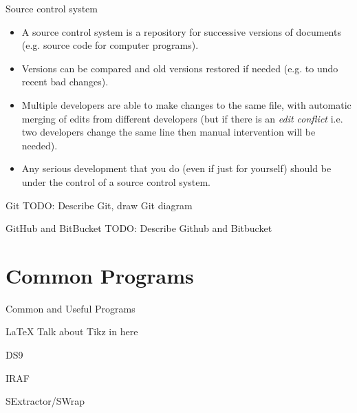 \documentclass{beamer}
\begin{document}
\begin{frame}{Source control system}

  \begin{itemize}
    \item A source control system is a repository for successive versions of documents (e.g. source code for computer programs).
    \item Versions can be compared and old versions restored if needed (e.g. to undo recent bad changes).
    \item Multiple developers are able to make changes to the same file, with automatic merging of edits from different developers (but if there is an \textit{edit conflict} i.e. two developers change the same line then manual intervention will be needed).
    \item Any serious development that you do (even if just for yourself) should be under the control of a source control system.
  \end{itemize}
\end{frame}
    
\begin{frame}{Git}    
  TODO: Describe Git, draw Git diagram
\end{frame}


\begin{frame}{GitHub and BitBucket}    
  TODO: Describe Github and Bitbucket
\end{frame}




\section{Common Programs}
\begin{frame}{Common and Useful Programs}
  \begin{block}{LaTeX}
    Talk about Tikz in here
  \end{block}
  \begin{block}{DS9}
  \end{block}
  \begin{block}{IRAF}
  \end{block}
  \begin{block}{SExtractor/SWrap}
  \end{block}
\end{frame}
\end{document}
